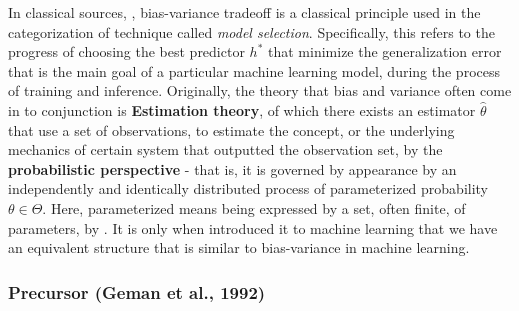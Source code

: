 \documentclass[10pt]{article} %
\begin{document}
In classical sources, \cite{gareth_james_introduction_2013,goodfellow2016deep,STL_Hajek_Maxim_2021,10.5555/2371238,10.5555/2621980}, bias-variance tradeoff is a classical principle used in the categorization of technique called \textit{model selection}. Specifically, this refers to the progress of choosing the best predictor $h^{*}$ that minimize the generalization error that is the main goal of a particular machine learning model, during the process of training and inference. Originally, the theory that bias and variance often come in to conjunction is \textbf{Estimation theory}, of which there exists an estimator $\hat{\theta}$ that use a set of observations, to estimate the concept, or the underlying mechanics of certain system that outputted the observation set, by the \textbf{probabilistic perspective} - that is, it is governed by appearance by an independently and identically distributed process of parameterized probability $\theta\in \Theta$. Here, parameterized means being expressed by a set, often finite, of parameters, by \cite{LehmannCasella_theory_1998,liam_statistics_2005}. It is only when \cite{6797087} introduced it to machine learning that we have an equivalent structure that is similar to bias-variance in machine learning. 

\subsubsection{Precursor (Geman et al., 1992)}
\end{document}
